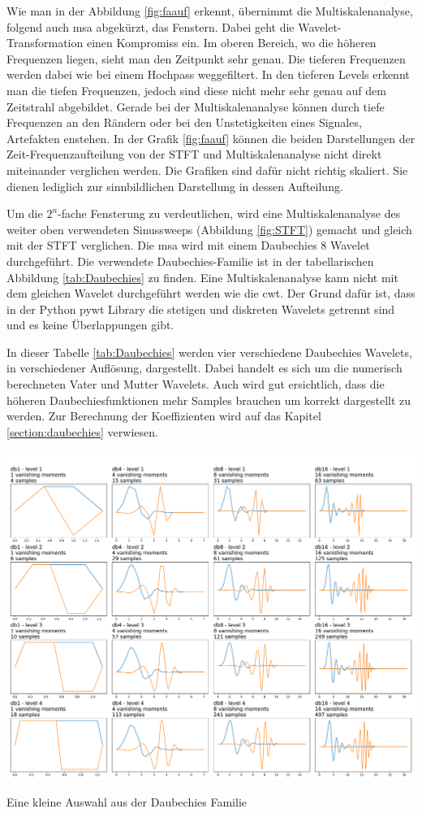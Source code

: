 Wie man in der Abbildung \ref{fig:faauf} erkennt, übernimmt die Multiskalenanalyse, folgend auch msa abgekürzt, das Fenstern. Dabei geht die Wavelet-Transformation einen Kompromiss ein. Im oberen Bereich, wo die höheren Frequenzen liegen, sieht man den Zeitpunkt sehr genau. Die tieferen Frequenzen werden dabei wie bei einem Hochpass weggefiltert. In den tieferen Levels erkennt man die tiefen Frequenzen, jedoch sind diese nicht mehr sehr genau auf dem Zeitstrahl abgebildet. Gerade bei der Multiskalenanalyse können durch tiefe Frequenzen an den Rändern oder bei den Unstetigkeiten eines Signales, Artefakten enstehen. In der Grafik \ref{fig:faauf} können die beiden Darstellungen der Zeit-Frequenzaufteilung von der STFT und Multiskalenanalyse nicht direkt miteinander verglichen werden. Die Grafiken sind dafür nicht richtig skaliert. Sie dienen lediglich zur sinnbildlichen Darstellung in dessen Aufteilung.

Um die $2^{n}$-fache Fensterung zu verdeutlichen, wird eine  Multiskalenanalyse des weiter oben verwendeten Sinussweeps (Abbildung \ref{fig:STFT}) gemacht und gleich mit der STFT verglichen.
Die msa wird mit einem Daubechies 8 Wavelet durchgeführt. Die verwendete Daubechies-Familie ist in der tabellarischen Abbildung \ref{tab:Daubechies} zu finden. Eine Multiskalenanalyse kann nicht mit dem gleichen Wavelet durchgeführt werden wie die cwt. Der Grund dafür ist, dass in der Python pywt Library die stetigen und diskreten Wavelets getrennt sind und es keine Überlappungen gibt.

In dieser Tabelle \ref{tab:Daubechies} werden vier verschiedene Daubechies Wavelets, in verschiedener Auflösung, dargestellt. Dabei handelt es sich um die numerisch berechneten Vater und Mutter Wavelets. Auch wird gut ersichtlich, dass die höheren Daubechiesfunktionen mehr Samples brauchen um korrekt dargestellt zu werden. Zur Berechnung der Koeffizienten wird auf das Kapitel \ref{section:daubechies} verwiesen.


\begin{table}[!ht]
	\includegraphics[width=\linewidth]{papers/autotune/sections/frequenzanalyse/images/DaubechiesFamilie.pdf}
	\caption{Eine kleine Auswahl aus der Daubechies Familie}
	\label{tab:Daubechies}
\end{table}

